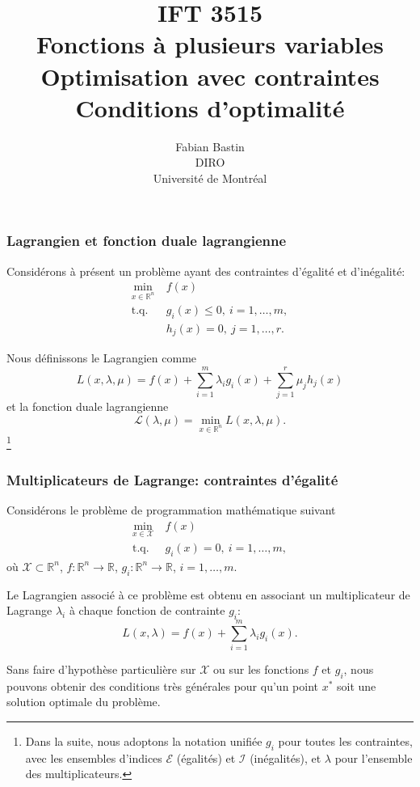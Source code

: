 \documentclass[usepdftitle=false,aspectratio=169]{beamer}
\title[IFT3515]{IFT 3515\\Fonctions à plusieurs variables\\Optimisation avec contraintes\\Conditions d'optimalité}
\author[Fabian Bastin]{Fabian Bastin\\DIRO\\Université de Montréal}
\date{}
\def\red{\color{red}}
\def\cE{\mathcal{E}}
\def\cI{\mathcal{I}}
\def\cL{\mathcal{L}}
\def\cX{\mathcal{X}}
\def\RR{\mathbb{R}}
\begin{document}
\frame{\titlepage}


\begin{frame}
	\frametitle{Lagrangien et fonction duale lagrangienne}
	
	Considérons à présent un problème ayant des contraintes d'égalité et d'inégalité:
	\begin{align*}
		\min_{x \in \mathbb{R}^n} \ & f(x) \\
		\mbox{t.q. } & g_i(x) \leq 0,\ i = 1,\ldots,m, \\
		& h_j(x) = 0,\ j = 1,\ldots,r.
	\end{align*}
	
	Nous définissons le Lagrangien comme
	$$
	L(x, \lambda, \mu) = f(x) + \sum_{i = 1}^m \lambda_i g_i(x)
	+ \sum_{j = 1}^r \mu_j h_j(x)
	$$
	et la fonction duale lagrangienne
	$$
	\cL(\lambda, \mu) = \min_{x \in \mathbb{R}^n} L(x, \lambda, \mu).
	$$\footnote{Dans la suite, nous adoptons la notation unifiée $g_i$ pour toutes les contraintes, avec les ensembles d'indices $\cE$ (égalités) et $\cI$ (inégalités), et $\lambda$ pour l'ensemble des multiplicateurs.}

\end{frame}

\begin{frame}
\frametitle{Multiplicateurs de Lagrange: contraintes d'égalité}

Considérons le problème de programmation mathématique suivant
\begin{align*}
\min_{x \in \cX} \ & f(x) \\
\mbox{t.q. } & g_i(x) = 0,\ i = 1,\ldots,m,
\end{align*}
où $\cX \subset \RR^n$, $f: \RR^n \rightarrow \RR$, $g_i: \RR^n \rightarrow \RR$, $i = 1,\ldots,m$.

\mbox{}

Le {\red Lagrangien} associé à ce problème est obtenu en associant un multiplicateur de Lagrange $\lambda_i$ à chaque fonction de contrainte $g_i$:
$$
L(x, \lambda) = f(x) + \sum_{i = 1}^{m} \lambda_i g_i(x).
$$

Sans faire d'hypothèse particulière sur $\cX$ ou sur les fonctions $f$ et $g_i$, nous pouvons obtenir des conditions très générales pour qu'un point $x^*$ soit une solution optimale du problème.

\end{frame}
\end{document}
